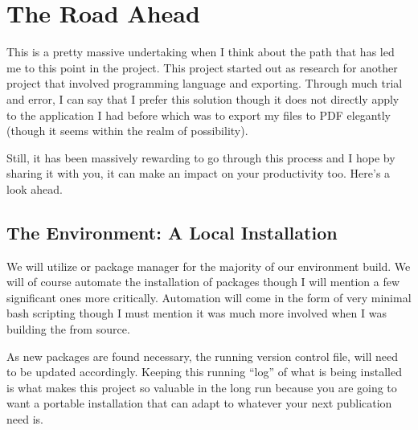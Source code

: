 \documentclass[letterpaper,12pt,english]{sphinxmanual}
\begin{document}
\section{The Road Ahead}
\label{\detokenize{_notebooks/00-the-goal:the-road-ahead}}
\sphinxAtStartPar
This is a pretty massive undertaking when I think about the path that has led me to this point in the project. This project started out as research for another project that involved  programming language and  exporting. Through much trial and error, I can say that I prefer this solution though it does not directly apply to the application I had before which was to export my  files to PDF elegantly (though it seems within the realm of possibility).

\sphinxAtStartPar
Still, it has been massively rewarding to go through this process and I hope by sharing it with you, it can make an impact on your productivity too. Here’s a look ahead.


\subsection{The Environment: A Local  Installation}
\label{\detokenize{_notebooks/00-the-goal:the-environment-a-local-conda-installation}}
\sphinxAtStartPar
We will utilize  or  package manager  for the majority of our environment build. We will of course automate the installation of packages though I will mention a few significant ones more critically. Automation will come in the form of very minimal bash scripting \textendash{}though I must mention it was much more involved when I was building the  from source.

\sphinxAtStartPar
As new packages are found necessary, the running version control file,  will need to be updated accordingly. Keeping this running “log” of what is being installed is what makes this project so valuable in the long run because you are going to want a portable installation that can adapt to whatever your next publication need is.
\end{document}
